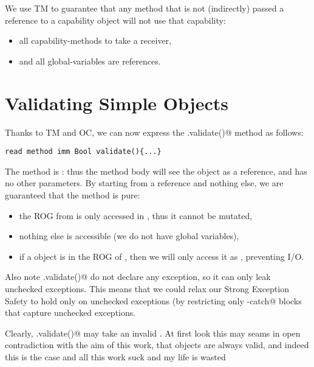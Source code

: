 We use TM to guarantee that any method that is not (indirectly) passed a \Q@mut@ reference to a capability object will not use that capability:
\begin{itemize}
\item all capability-methods to take a \Q@mut@ receiver,
\item and all global-variables are \Q@imm@ references.
\end{itemize}






\section{Validating Simple Objects}

Thanks to TM and OC, we can now express the \Q@.validate()@ method as follows:
\saveSpace
\begin{lstlisting}
read method imm Bool validate(){...}
\end{lstlisting}
\saveSpace
The method is \Q@read@: thus the method body will see the \Q@this@ object as a \Q@read@ reference, and has no other parameters.
By starting from a \Q@read@ reference and nothing else, we are guaranteed that the method is pure:
\begin{itemize}
\item the ROG from \Q@this@ is only accessed in \Q@read@, thus it cannot be mutated,
\item nothing else is accessible (we do not have global variables),
\item if a \Q@System@ object is in the ROG of \Q@this@, then we will only access it as \Q@read@, preventing I/O.
\end{itemize}

Also note \Q@.validate()@ do not declare any \Q@throws@ exception, so it can only leak unchecked exceptions.
This means that we could relax our Strong Exception Safety to hold only on unchecked exceptions (by restricting only \Q@try-catch@ blocks that capture unchecked exceptions.

Clearly, \Q@.validate()@ may take an invalid \Q@this@. At first look this may seams in open contradiction
with the aim of this work, that objects are always valid, and indeed this is the case and all this work suck and my life is wasted


